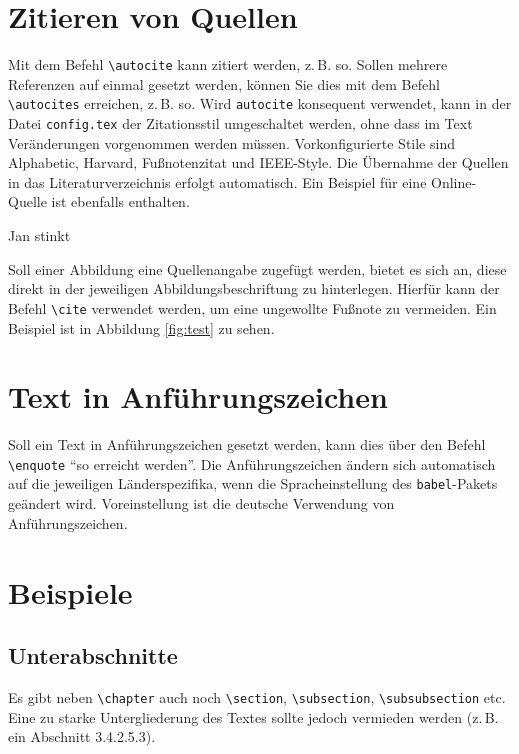 \section{Zitieren von Quellen}
Mit dem Befehl \texttt{\textbackslash autocite} kann zitiert werden, z.\,B. so. Sollen mehrere Referenzen auf einmal gesetzt werden, können Sie dies mit dem Befehl \texttt{\textbackslash autocites} erreichen, z.\,B. so. Wird \texttt{autocite} konsequent 
verwendet, kann in der Datei \texttt{config.tex} der Zitationsstil umgeschaltet werden, ohne dass im Text Veränderungen vorgenommen werden müssen. Vorkonfigurierte Stile sind Alphabetic, Harvard, Fußnotenzitat und IEEE-Style. Die Übernahme der Quellen in das Literaturverzeichnis erfolgt automatisch. Ein Beispiel für eine Online-Quelle ist ebenfalls enthalten.\autocite[Vgl.][]{TestOnlineQuelle}

\medskip
Jan stinkt \autocite{Stutenbaumer.2015}


Soll einer Abbildung eine Quellenangabe zugefügt werden, bietet es sich an, diese direkt in der jeweiligen Abbildungsbeschriftung zu hinterlegen. Hierfür kann der Befehl \texttt{\textbackslash cite} verwendet werden, um eine ungewollte Fußnote zu vermeiden. Ein Beispiel ist in Abbildung 
\vref{fig:test} zu sehen. 


\section{Text in Anführungszeichen}
Soll ein Text in Anführungszeichen gesetzt werden, kann dies über den Befehl \texttt{\textbackslash enquote} \enquote{so erreicht werden}. Die Anführungszeichen ändern sich automatisch auf die 
jeweiligen Länderspezifika, wenn die Spracheinstellung des \texttt{babel}-Pakets geändert wird. Voreinstellung ist die deutsche Verwendung von 
Anführungszeichen.




\section{Beispiele}
\lipsum[1]

\subsection{Unterabschnitte}
Es gibt neben \texttt{\textbackslash chapter} auch noch  \texttt{\textbackslash section}, \texttt{\textbackslash subsection}, \texttt{\textbackslash subsubsection} etc. Eine zu starke Untergliederung des Textes sollte jedoch vermieden werden (z.\,B. ein Abschnitt 3.4.2.5.3). 

